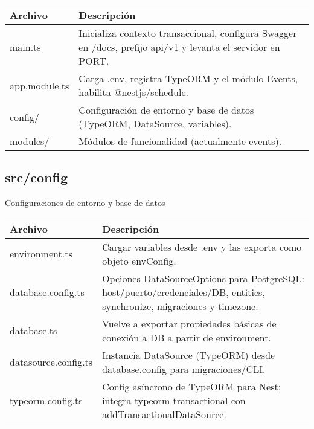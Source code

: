 \begin{table}[H]
  \doublespacing
  \begin{tabularx}{\textwidth}{l X}
    \hline
    \textbf{Archivo} & \textbf{Descripción}                                                                                         \\
    \hline
    main.ts          & Inicializa contexto transaccional, configura Swagger en /docs, prefijo api/v1 y levanta el servidor en PORT. \\
    app.module.ts    & Carga .env, registra TypeORM y el módulo Events, habilita @nestjs/schedule.                                  \\
    config/          & Configuración de entorno y base de datos (TypeORM, DataSource, variables).                                   \\
    modules/         & Módulos de funcionalidad (actualmente events).                                                               \\
    \hline
  \end{tabularx}
\end{table}

\subsection*{src/config}

Configuraciones de entorno y base de datos

\begin{table}[H]
  \doublespacing
  \begin{tabularx}{\textwidth}{l X}
    \hline
    \textbf{Archivo}     & \textbf{Descripción}                                                                                                    \\
    \hline
    environment.ts       & Cargar variables desde .env y las exporta como objeto envConfig.                                                        \\
    database.config.ts   & Opciones DataSourceOptions para PostgreSQL: host/puerto/credenciales/DB, entities, synchronize, migraciones y timezone. \\
    database.ts          & Vuelve a exportar propiedades básicas de conexión a DB a partir de environment.                                         \\
    datasource.config.ts & Instancia DataSource (TypeORM) desde database.config para migraciones/CLI.                                              \\
    typeorm.config.ts    & Config asíncrono de TypeORM para Nest; integra typeorm-transactional con addTransactionalDataSource.                    \\
    \hline
  \end{tabularx}
\end{table}

